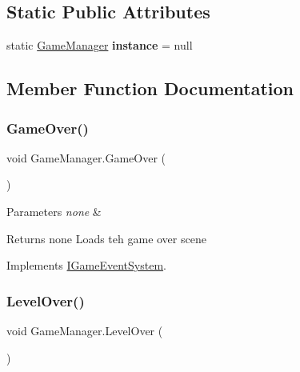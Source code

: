 \subsection*{Static Public Attributes}
\begin{DoxyCompactItemize}
\item 
\mbox{\label{class_game_manager_a7666e8468dac197b9eb32dd32128524f}} 
static \mbox{\hyperlink{class_game_manager}{Game\+Manager}} {\bfseries instance} = null
\end{DoxyCompactItemize}


\subsection{Member Function Documentation}
\mbox{\label{class_game_manager_a8d69157cb6b97eabeff2374d8e9adeaf}} 
\subsubsection{\texorpdfstring{Game\+Over()}{GameOver()}}
{\footnotesize\ttfamily void Game\+Manager.\+Game\+Over (\begin{DoxyParamCaption}{ }\end{DoxyParamCaption})\hspace{0.3cm}{\ttfamily [inline]}}


\begin{DoxyParams}{Parameters}
{\em none} & \\
\hline
\end{DoxyParams}
\begin{DoxyReturn}{Returns}
none Loads teh game over scene 
\end{DoxyReturn}


Implements \mbox{\hyperlink{interface_i_game_event_system_ab5c4b8b1d1a6fe358eb2ac3ffa93d835}{I\+Game\+Event\+System}}.

\mbox{\label{class_game_manager_ad5ae8ae2e2fe74743e89e70b47563639}} 
\subsubsection{\texorpdfstring{Level\+Over()}{LevelOver()}}
{\footnotesize\ttfamily void Game\+Manager.\+Level\+Over (\begin{DoxyParamCaption}{ }\end{DoxyParamCaption})\hspace{0.3cm}{\ttfamily [inline]}}


